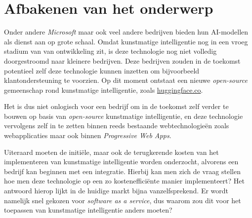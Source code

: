 \bigbreak{}

\section{Afbakenen van het onderwerp}

Onder andere \textit{Microsoft} maar ook veel andere bedrijven bieden hun AI-modellen als dienst aan op grote schaal. Omdat kunstmatige intelligentie nog in een vroeg stadium van van ontwikkeling zit, is deze technologie nog niet volledig doorgestroomd naar kleinere bedrijven. Deze bedrijven zouden in de toekomst potentieel zelf deze technologie kunnen inzetten om bijvoorbeeld klant\-on\-der\-steu\-ning te voorzien. Op dit moment ontstaat een nieuwe \textit{open-source} gemeenschap rond kunstmatige intelligentie, zoals \href{https://huggingface.co/}{huggingface.co}.

\bigbreak{}

Het is dus niet onlogisch voor een bedrijf om in de toekomst zelf verder te bouwen op basis van \textit{open-source} kunstmatige intelligentie, en deze technologie vervolgens zelf in te zetten binnen reeds bestaande webtechnologieën zoals web\-app\-li\-ca\-ties maar ook binnen \textit{Progressive Web Apps}.

\bigbreak{}

Uiteraard moeten de initiële, maar ook de terugkerende kosten van het implementeren van kunstmatige intelligentie worden onderzocht, alvorens een bedrijf kan beginnen met een integratie. Hierbij kan men zich de vraag stellen hoe men deze technologie op een zo kostenefficiënte manier implementeert? Het antwoord hierop lijkt in de huidige markt bijna vanzelfsprekend. Er wordt namelijk snel gekozen voor \textit{software as a service}, dus waarom zou dit voor het toepassen van kunstmatige intelligentie anders moeten?

\section{}%
\label{sec:probleemstelling}


